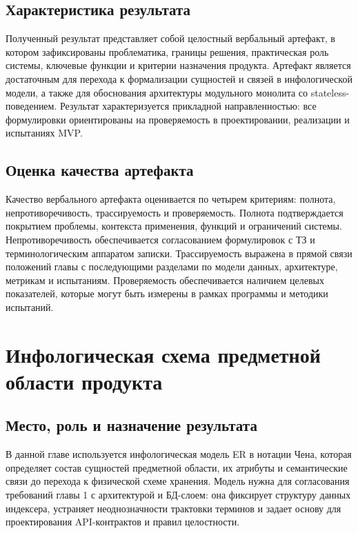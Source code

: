 ﻿\documentclass[14pt,a4paper]{extarticle}
\begin{document}
\subsection{Характеристика результата}
\noindent Полученный результат представляет собой целостный вербальный артефакт, в котором зафиксированы проблематика, границы решения, практическая роль системы, ключевые функции и критерии назначения продукта. Артефакт является достаточным для перехода к формализации сущностей и связей в инфологической модели, а также для обоснования архитектуры модульного монолита со stateless-поведением. Результат характеризуется прикладной направленностью: все формулировки ориентированы на проверяемость в проектировании, реализации и испытаниях MVP.

\subsection{Оценка качества артефакта}
\noindent Качество вербального артефакта оценивается по четырем критериям: полнота, непротиворечивость, трассируемость и проверяемость. Полнота подтверждается покрытием проблемы, контекста применения, функций и ограничений системы. Непротиворечивость обеспечивается согласованием формулировок с ТЗ и терминологическим аппаратом записки. Трассируемость выражена в прямой связи положений главы с последующими разделами по модели данных, архитектуре, метрикам и испытаниям. Проверяемость обеспечивается наличием целевых показателей, которые могут быть измерены в рамках программы и методики испытаний.

\newpage

\section{Инфологическая схема предметной области продукта}

\subsection{Место, роль и назначение результата}
\noindent В данной главе используется инфологическая модель ER в нотации Чена, которая определяет состав сущностей предметной области, их атрибуты и семантические связи до перехода к физической схеме хранения. Модель нужна для согласования требований главы 1 с архитектурой и БД-слоем: она фиксирует структуру данных индексера, устраняет неоднозначности трактовки терминов и задает основу для проектирования API-контрактов и правил целостности.
\end{document}
